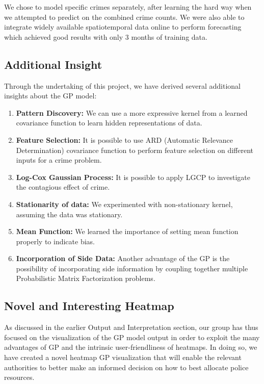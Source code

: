 \documentclass[letterpaper]{article}
\begin{document}
	We chose to model specific crimes separately, after learning the hard way when we attempted to predict on the combined crime counts. We were also able to integrate widely available spatiotemporal data online to perform forecasting which achieved good results with only 3 months of training data.
	
	\subsection{Additional Insight}
	Through the undertaking of this project, we have derived several additional insights about the GP model:
	\begin{enumerate}
		\item {\bf Pattern Discovery:} We can use a more expressive kernel from a learned covariance function to learn hidden representations of data. \autocite{3}
		\item {\bf Feature Selection:} It is possible to use ARD (Automatic Relevance Determination) covariance function to perform feature selection on different inputs for a crime problem. \autocite{3}
		\item {\bf Log-Cox Gaussian Process:} It is possible to apply LGCP to investigate the contagious effect of crime. \autocite{c05}
		\item {\bf Stationarity of data:} We experimented with non-stationary kernel, assuming the data was stationary.
		\item {\bf Mean Function:} We learned the importance of setting mean function properly to indicate bias.
		\item {\bf Incorporation of Side Data:} Another advantage of the GP is the possibility of incorporating side information by coupling together multiple Probabilistic Matrix Factorization problems. \autocite{2}
	\end{enumerate}
	
	\subsection{Novel and Interesting Heatmap}
		As discussed in the earlier Output and Interpretation section, our group has thus focused on the visualization of the GP model output in order to exploit the many advantages of GP and the intrinsic user-friendliness of heatmaps.
	In doing so, we have created a novel heatmap GP visualization that will enable the relevant authorities to better make an informed decision on how to best allocate police resources.
	
\end{document}
